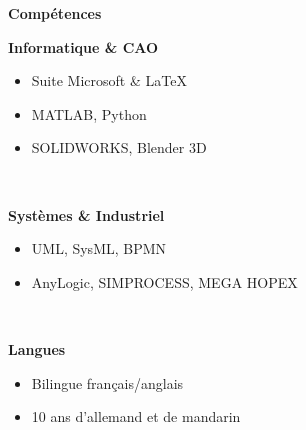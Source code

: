 \documentclass[10pt]{article}
\newcommand{\cvsec}[1]{{\Large\makebox[3cm][l]{\rule{3cm}{0.4pt}} \textbf{#1} \hrulefill\\[6pt]}}
\begin{document}
\cvsec{Compétences}
\begin{minipage}[t]{0.32\linewidth}
    {\large\textbf{Informatique \& CAO}}
    \begin{itemize}[leftmargin=*]
        \item Suite Microsoft \& \LaTeX\
        \item MATLAB, Python
        \item SOLIDWORKS, Blender 3D
    \end{itemize}
\end{minipage}
~
\begin{minipage}[t]{0.32\linewidth}
    {\large\textbf{Systèmes \& Industriel}}
    \begin{itemize}[leftmargin=*]
        \item UML, SysML, BPMN
        \item AnyLogic, SIMPROCESS, MEGA HOPEX
    \end{itemize}
\end{minipage}
~
\begin{minipage}[t]{0.32\linewidth}
    {\large\textbf{Langues}}
    \begin{itemize}[leftmargin=*]
        \item Bilingue français/anglais
        \item 10 ans d'allemand et de mandarin
    \end{itemize}
\end{minipage}
\end{document}
